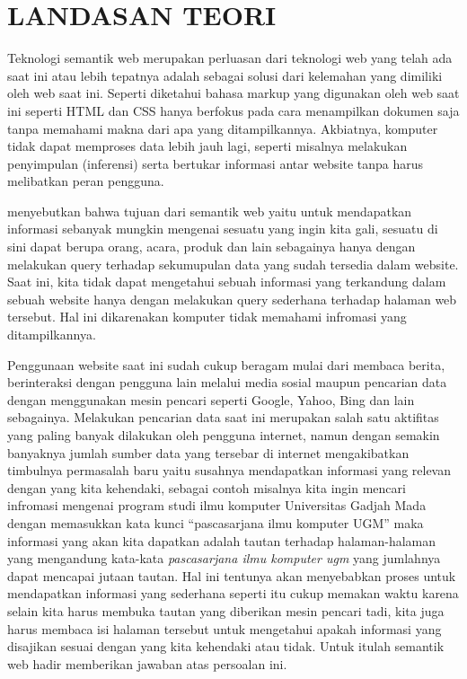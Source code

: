 \chapter{LANDASAN TEORI}
Teknologi semantik web merupakan perluasan dari teknologi web yang telah ada saat ini atau lebih tepatnya adalah sebagai solusi dari kelemahan yang dimiliki oleh web saat ini. Seperti diketahui bahasa markup yang digunakan oleh web saat ini seperti HTML dan CSS hanya berfokus pada cara menampilkan dokumen saja tanpa memahami makna dari apa yang ditampilkannya. Akbiatnya, komputer tidak dapat memproses data lebih jauh lagi, seperti misalnya melakukan penyimpulan (inferensi) serta bertukar informasi antar website tanpa harus melibatkan peran pengguna.

\citet{liyang_yu} menyebutkan bahwa tujuan dari semantik web yaitu untuk mendapatkan informasi sebanyak mungkin mengenai sesuatu yang ingin kita gali, sesuatu di sini dapat berupa orang, acara, produk dan lain sebagainya hanya dengan melakukan query terhadap sekumupulan data yang sudah tersedia dalam website. Saat ini, kita tidak dapat mengetahui sebuah informasi yang terkandung dalam sebuah website hanya dengan melakukan query sederhana terhadap halaman web tersebut. Hal ini dikarenakan komputer tidak memahami infromasi yang ditampilkannya.

Penggunaan website saat ini sudah cukup beragam mulai dari membaca berita, berinteraksi dengan pengguna lain melalui media sosial maupun pencarian data dengan menggunakan mesin pencari seperti Google, Yahoo, Bing dan lain sebagainya. Melakukan pencarian data saat ini merupakan salah satu aktifitas yang paling banyak dilakukan oleh pengguna internet, namun dengan semakin banyaknya jumlah sumber data yang tersebar di internet mengakibatkan timbulnya permasalah baru yaitu susahnya mendapatkan informasi yang relevan dengan yang kita kehendaki, sebagai contoh misalnya kita ingin mencari infromasi mengenai program studi ilmu komputer Universitas Gadjah Mada dengan memasukkan kata kunci ``pascasarjana ilmu komputer UGM'' maka informasi yang akan kita dapatkan adalah tautan terhadap halaman-halaman yang mengandung kata-kata \emph{pascasarjana ilmu komputer ugm} yang jumlahnya dapat mencapai jutaan tautan. Hal ini tentunya akan menyebabkan proses untuk mendapatkan informasi yang sederhana seperti itu cukup memakan waktu karena selain kita harus membuka tautan yang diberikan mesin pencari tadi, kita juga harus membaca isi halaman tersebut untuk mengetahui apakah informasi yang disajikan sesuai dengan yang kita kehendaki atau tidak. Untuk itulah semantik web hadir memberikan jawaban atas persoalan ini.

